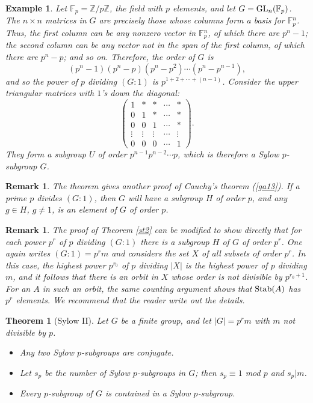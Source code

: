 \documentclass[a4paper,11pt,final]{memoir}%
\newtheorem{theorem}[X]{Theorem}
\newtheorem{example}[X]{Example}
\newtheorem{remark}[X]{Remark}
\theoremstyle{nonumberplain}
\begin{document}
\begin{example}
\label{st5} Let $\mathbb{F}_{p}=\mathbb{Z}/p\mathbb{Z}$, the field with $p$
elements, and let $G=\operatorname{GL}_{n}(\mathbb{F}_{p})$. The $n\times n$ matrices in $G$
are precisely those whose columns form a basis for $\mathbb{F}{}_{p}^{n}$.
Thus, the first column can be any nonzero vector in $\mathbb{F}{}_{p}^{n}$, of
which there are $p^{n}-1$; the second column can be any vector not in the span
of the first column, of which there are $p^{n}-p$; and so on. Therefore, the
order of $G$ is%
\[
(p^{n}-1)(p^{n}-p)(p^{n}-p^{2})\cdots(p^{n}-p^{n-1}),
\]
and so the power of $p$ dividing $(G:1)$ is $p^{1+2+\cdots+(n-1)}$. Consider
the upper triangular matrices with $1$'s down the diagonal:
\[%
\begin{pmatrix}
1 & \ast & \ast & \cdots & \ast\\
0 & 1 & \ast & \cdots & \ast\\
0 & 0 & 1 & \cdots & \ast\\
\vdots & \vdots & \vdots & \cdots & \vdots\\
0 & 0 & 0 & \cdots & 1
\end{pmatrix}
.
\]
They form a subgroup $U$ of order $p^{n-1}p^{n-2}\cdots p$, which is therefore
a Sylow $p$-subgroup $G$.
\end{example}

\begin{remark}
\label{st4}The theorem gives another proof of Cauchy's theorem (\ref{ga13}).
If a prime $p$ divides $(G\colon1)$, then $G$ will have a subgroup $H$ of
order $p$, and any $g\in H$, $g\neq1$, is an element of $G$ of order $p$.
\end{remark}

\begin{remark}
\label{st3}The proof of Theorem \ref{st2} can be modified to show directly
that for each power $p^{r}$ of $p$ dividing $(G:1)$ there is a subgroup $H$ of
$G$ of order $p^{r}$. One again writes $(G:1)=p^{r}m$ and considers the set
$X$ of all subsets of order $p^{r}$. In this case, the highest power
$p^{r_{0}}$ of $p$ dividing $|X|$ is the highest power of $p$ dividing $m$,
and it follows that there is an orbit in $X$ whose order is not divisible by
$p^{r_{0}+1}$. For an $A$ in such an orbit, the same counting argument shows
that $\operatorname{Stab}(A)$ has $p^{r}$ elements. We recommend that the reader write out
the details.
\end{remark}

\begin{theorem}
[Sylow II]\label{st7}%
%
Let $G$ be a finite group, and let $|G|=p^{r}m$ with $m$ not divisible by $p$.

\begin{itemize}
\item[(a)] Any two Sylow $p$-subgroups are conjugate.

\item[(b)] Let $s_{p}$ be the number of Sylow $p$-subgroups in $G$; then
$s_{p}\equiv1$ mod $p$ and $s_{p}|m$.

\item[(c)] Every $p$-subgroup of $G$ is contained in a Sylow $p$-subgroup.
\end{itemize}
\end{theorem}
\end{document}
